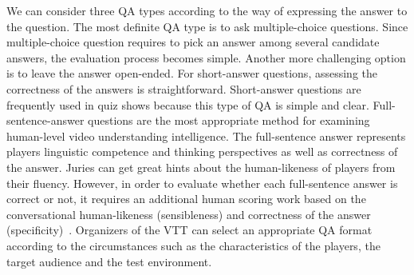 \documentclass[letterpaper]{article} %
\begin{document}
We can consider three QA types according to the way of expressing the answer to the question. The most definite QA type is to ask multiple-choice questions. Since multiple-choice question requires to pick an answer among several candidate answers, the evaluation process becomes simple. 
Another more challenging option is to leave the answer open-ended. For short-answer questions, assessing the correctness of the answers is straightforward. Short-answer questions are frequently used in quiz shows because this type of QA is simple and clear. Full-sentence-answer questions are the most appropriate method for examining human-level video understanding intelligence. The full-sentence answer represents players linguistic competence and thinking perspectives as well as correctness of the answer. Juries can get great hints about the human-likeness of players from their fluency. However, in order to evaluate whether each full-sentence answer is correct or not, it requires an additional human scoring work based on the conversational human-likeness (sensibleness) and correctness of the answer (specificity)~\cite{adiwardana2020meena}. 
Organizers of the VTT can select an appropriate QA format according to the circumstances such as the characteristics of the players, the target audience and the test environment.
\end{document}
